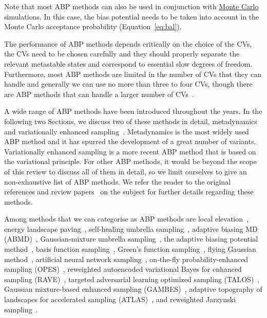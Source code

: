 \documentclass[9pt,review]{livecoms}
\begin{document}
Note that most ABP methods can also be used in conjunction with \hyperlink{ref:MetropolisMonteCarlo} {Monte Carlo} simulations. In this case, the bias potential needs to be taken into account in the Monte Carlo acceptance probability (Equation~\ref{eq:bal}).

The performance of ABP methods depends critically on the choice of the CVs, the CVs need to be chosen carefully and they should properly separate the relevant metastable states and correspond to essential slow degrees of freedom. Furthermore, most ABP methods are limited in the number of CVs that they can handle and generally we can use no more than three to four CVs, though there are ABP methods that can handle a larger number of CVs~\cite{Piana2007_bemeta,Pfaendtner2015_pbmetad}.

A wide range of ABP methods have been introduced throughout the years. In the following two Sections, we discuss two of these methods in detail, metadynamics~\cite{Laio-PNAS-2002,Barducci-PRL-2008,Valsson2016_ARPC_MetaD} and variationally enhanced sampling~\cite{Valsson_VES_PRL_2014,Valsson2020Handbook_VES}. Metadynamics is the most widely used ABP method and it has spurred the development of a great number of variants. Variationally enhanced sampling is a more recent ABP method that is based on the variational principle. For other ABP methods, it would be beyond the scope of this review to discuss all of them in detail, so we limit ourselves to give an non-exhaustive list of ABP methods. We refer the reader to the original references and review papers~\cite{Dickson_ABP-Review_2017,Shalini_Review_2019,Allison_Review_2020} on the subject for further details regarding these methods.

Among methods that we can  categorise as ABP methods are
local elevation~\cite{Huber1994},
energy landscape paving~\cite{Hansmann-PRL-2002},
self-healing umbrella sampling~\cite{Marsili2006,Gersende_SelfHealing_2017},
adaptive biasing MD (ABMD)~\cite{Babin2008},
Gaussian-mixture umbrella sampling~\cite{Maragakis-JPCB-2009}, the adaptive biasing potential method~\cite{Dickson2010},
basis function sampling~\cite{Whitmer_BFS_2014}, Green's function sampling~\cite{Whitmer_GFS_2015}, flying Gaussian method~\cite{Sucur2016},
artificial neural network sampling~\cite{Sidky_ANNSampling_2018},
on-the-fly probability-enhanced sampling (OPES)~\cite{Invernizzi2020opus,invernizzi2020unified},
reweighted autoencoded variational Bayes for enhanced sampling (RAVE)~\cite{Tiwary_RAVE_2018},
targeted adversarial learning optimized sampling (TALOS)~\cite{Zhang_TALOS_2019},
Gaussian mixture-based enhanced sampling (GAMBES)~\cite{Debnath_GAMBES_2020},
adaptive topography of landscapes for accelerated sampling
(ATLAS)~\cite{giberti2021atlas},
and reweighted Jarzynski sampling~\cite{Bal_ReweightedJarzynski_2021}.
\end{document}
